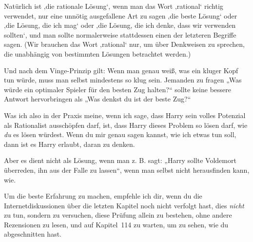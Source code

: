 {%
Natürlich ist ‚die rationale Lösung‘, wenn man das Wort ‚rational‘ richtig verwendet, nur eine unnötig ausgefallene Art zu sagen ‚die beste Lösung‘ oder ‚die Lösung, die ich mag‘ oder ‚die Lösung, die ich denke, dass wir verwenden sollten‘, und man sollte normalerweise stattdessen einen der letzteren Begriffe sagen. (Wir brauchen das Wort ‚rational‘ nur, um über Denkweisen zu sprechen, die unabhängig von bestimmten Lösungen betrachtet werden.)


Und nach dem Vinge-Prinzip gilt: Wenn man genau weiß, was ein kluger Kopf tun würde, muss man selbst mindestens so klug sein. Jemanden zu fragen „Was würde ein optimaler Spieler für den besten Zug halten?“ sollte keine bessere Antwort hervorbringen als „Was denkst du ist der beste Zug?“

Was ich also in der Praxis meine, wenn ich sage, dass Harry sein volles Potenzial als Rationalist ausschöpfen darf, ist, dass Harry dieses Problem so lösen darf, wie \emph{du} es lösen würdest. Wenn du mir genau sagen kannst, wie ich etwas tun soll, dann ist es Harry erlaubt, daran zu denken.

Aber es dient nicht als Lösung, wenn man z. B. sagt: „Harry sollte Voldemort überreden, ihn aus der Falle zu lassen“, wenn man selbst nicht herausfinden kann, wie.

Um die beste Erfahrung zu machen, empfehle ich dir, wenn du die Internetdiskussionen über die letzten Kapitel noch nicht verfolgt hast, dies \emph{nicht} zu tun, sondern zu versuchen, diese Prüfung allein zu bestehen, ohne andere Rezensionen zu lesen, und auf Kapitel~114 zu warten, um zu sehen, wie du abgeschnitten hast.

}
